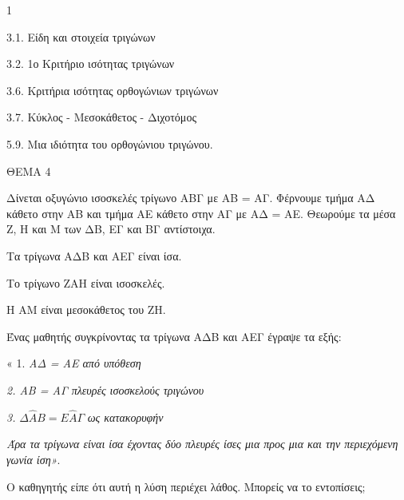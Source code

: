 \begin{ylh}{1}
    \item 3.1. Είδη και στοιχεία τριγώνων
    \item 3.2. 1ο Κριτήριο ισότητας τριγώνων
    \item 3.6. Κριτήρια ισότητας ορθογώνιων τριγώνων
    \item 3.7. Κύκλος - Μεσοκάθετος - Διχοτόμος
    \item 5.9. Μια ιδιότητα του ορθογώνιου τριγώνου.
\end{ylh}

ΘΕΜΑ 4

Δίνεται οξυγώνιο ισοσκελές τρίγωνο ΑΒΓ με ΑΒ = ΑΓ. Φέρνουμε τμήμα ΑΔ κάθετο στην ΑΒ και τμήμα ΑΕ κάθετο στην ΑΓ με ΑΔ = ΑΕ. Θεωρούμε τα μέσα Ζ, Η και Μ των ΔΒ, ΕΓ και ΒΓ αντίστοιχα.

\begin{alist}
\item Να αποδείξετε ότι:

.}
\end{alist}
\begin{alist}
\item
  Τα τρίγωνα ΑΔΒ και ΑΕΓ είναι ίσα. 
\item
  Το τρίγωνο ΖΑΗ είναι ισοσκελές. 
\item
  Η ΑΜ είναι μεσοκάθετος του ΖΗ. 

\item Ένας μαθητής συγκρίνοντας τα τρίγωνα ΑΔΒ και ΑΕΓ έγραψε τα εξής:

« 1. \emph{ΑΔ = ΑΕ από υπόθεση}

\emph{2. ΑΒ = ΑΓ πλευρές ισοσκελούς τριγώνου}

\emph{3.} $\Delta\widehat{Α}Β = Ε\widehat{Α}\Gamma$ \emph{ως κατακορυφήν}

\emph{Άρα τα τρίγωνα είναι ίσα έχοντας δύο πλευρές ίσες μια προς μια και την περιεχόμενη γωνία ίση»}.

Ο καθηγητής είπε ότι αυτή η λύση περιέχει λάθος. Μπορείς να το εντοπίσεις; 


\end{alist}
